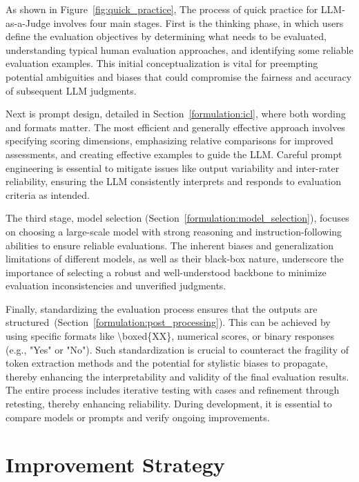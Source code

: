 \documentclass[acmsmall,screen]{acmart}
\begin{document}
As shown in Figure~\ref{fig:quick_practice}, The process of quick practice for LLM-as-a-Judge involves four main stages.
First is the thinking phase, in which users define the evaluation objectives by determining what needs to be evaluated, understanding typical human evaluation approaches, and identifying some reliable evaluation examples. This initial conceptualization is vital for preempting potential ambiguities and biases that could compromise the fairness and accuracy of subsequent LLM judgments.

Next is prompt design, detailed in Section~\ref{formulation:icl}, where both wording and formats matter. The most efficient and generally effective approach involves specifying scoring dimensions, emphasizing relative comparisons for improved assessments, and creating effective examples to guide the LLM. Careful prompt engineering is essential to mitigate issues like output variability and inter-rater reliability, ensuring the LLM consistently interprets and responds to evaluation criteria as intended.

The third stage, model selection (Section~\ref{formulation:model_selection}), focuses on choosing a large-scale model with strong reasoning and instruction-following abilities to ensure reliable evaluations. The inherent biases and generalization limitations of different models, as well as their black-box nature, underscore the importance of selecting a robust and well-understood backbone to minimize evaluation inconsistencies and unverified judgments.

Finally, standardizing the evaluation process ensures that the outputs are structured~(Section~\ref{formulation:post_processing}). This can be achieved by using specific formats like \textbackslash{boxed\{XX\}}, numerical scores, or binary responses (e.g., "Yes" or "No"). Such standardization is crucial to counteract the fragility of token extraction methods and the potential for stylistic biases to propagate, thereby enhancing the interpretability and validity of the final evaluation results. The entire process includes iterative testing with cases and refinement through retesting, thereby enhancing reliability. During development, it is essential to compare models or prompts and verify ongoing improvements.



\section{Improvement Strategy}\label{sec:improvement}
\end{document}
